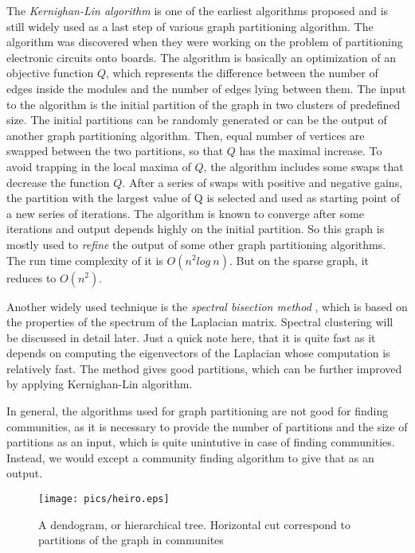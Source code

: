 \documentclass[letterpaper]{article}
\begin{document}
The \emph{Kernighan-Lin algorithm} \cite{kerni70} is one of the earliest
algorithms proposed and is still widely used as a last step of various graph
partitioning algorithm. The algorithm was discovered when they were working on
the problem of partitioning electronic circuits onto boards. The algorithm is
basically an optimization of an objective function $Q$, which represents the
difference between the number of edges inside the modules and the number of
edges lying between them.  The input to the algorithm is the initial partition
of the graph in two clusters of predefined size.  The initial partitions can be
randomly generated or can be the output of another graph partitioning
algorithm. Then, equal number of vertices are swapped between the two
partitions, so that $Q$ has the maximal increase. To avoid trapping in the
local maxima of $Q$, the algorithm includes some swaps that decrease the
function $Q$. After a series of swaps with positive and negative gains, the
partition with the largest value of Q is selected and used as starting point of
a new series of iterations.  The algorithm is known to converge after some
iterations and output depends highly on the initial partition.  So this graph
is mostly used to \emph{refine} the output of some other graph partitioning
algorithms. The run time complexity of it is $O(n^2 log\ n)$. But on the sparse
graph, it reduces to $O(n^2)$. 

Another widely used technique is the \emph{spectral bisection method}
\cite{barnes82}, which is based on the properties of the spectrum of the
Laplacian matrix. Spectral clustering will be discussed in detail later.  Just
a quick note here, that it is quite fast as it depends on computing the
eigenvectors of the Laplacian whose computation is relatively fast. The method
gives good partitions, which can be further improved by applying Kernighan-Lin
algorithm.


In general, the algorithms used for graph partitioning are not good for finding
communities, as it is necessary to provide the number of partitions and the
size of partitions as an input, which is quite unintutive in case of finding
communities. Instead, we would except a community finding algorithm to give
that as an output.  



\begin{figure}
\texttt{[image: pics/heiro.eps]}
\caption{A dendogram, or hierarchical tree. Horizontal cut correspond to
partitions of the graph in communites} \label{fig:heiro}
\end{figure}
\end{document}
